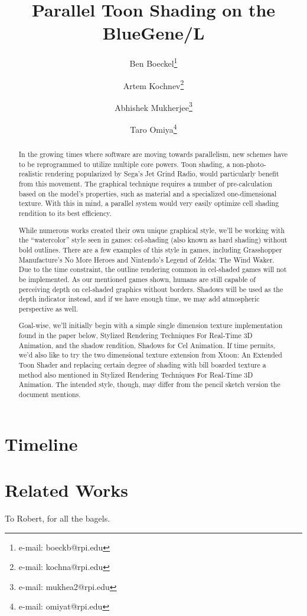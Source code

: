 \documentclass[preprint]{acmsiggraph}          %
\title{Parallel Toon Shading on the BlueGene/L}
\author{%
Ben Boeckel\thanks{e-mail: boeckb@rpi.edu} %
\and Artem Kochnev\thanks{e-mail: kochna@rpi.edu} %
\and Abhishek Mukherjee\thanks{e-mail: mukhea2@rpi.edu} %
\and Taro Omiya\thanks{e-mail: omiyat@rpi.edu}}
\begin{document}
\maketitle

\begin{abstract}

In the growing times where software are moving towards parallelism, new schemes
have to be reprogrammed to utilize multiple core powers.  Toon shading, a
non-photo-realistic rendering popularized by Sega's Jet Grind Radio, would
particularly benefit from this movement.  The graphical technique requires a
number of pre-calculation based on the model's properties, such as material and
a specialized one-dimensional texture.  With this in mind, a parallel system
would very easily optimize cell shading rendition to its best efficiency.

While numerous works created their own unique graphical style, we'll be working
with the ``watercolor'' style seen in games: cel-shading (also known as hard
shading) without bold outlines.  There are a few examples of this style in
games, including Grasshopper Manufacture's No More Heroes and Nintendo's Legend
of Zelda: The Wind Waker.  Due to the time constraint, the outline rendering
common in cel-shaded games will not be implemented.  As our mentioned games
shown, humans are still capable of perceiving depth on cel-shaded graphics
without borders.  Shadows will be used as the depth indicator instead, and if
we have enough time, we may add atmospheric perspective as well.

Goal-wise, we'll initially begin with a simple single dimension texture
implementation found in the paper below, Stylized Rendering Techniques For
Real-Time 3D Animation, and the shadow rendition, Shadows for Cel Animation.
If time permits, we'd also like to try the two dimensional texture extension
from Xtoon: An Extended Toon Shader and replacing certain degree of shading
with bill boarded texture a method also mentioned in Stylized Rendering
Techniques For Real-Time 3D Animation.  The intended style, though, may differ
from the pencil sketch version the document mentions.

\end{abstract}



\keywordlist

\section*{Timeline}

\section*{Related Works}

To Robert, for all the bagels.\cite{lake2000srt}


\nocite{*}

\end{document}
